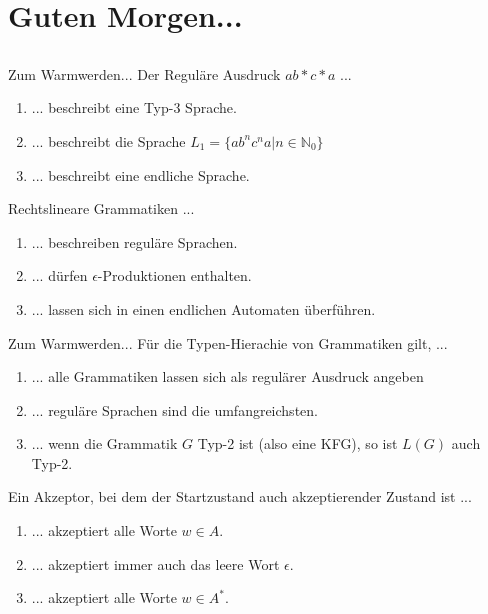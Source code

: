\section[Einstieg]{Guten Morgen...}
\subsection*{}
\begin{frame}{Zum Warmwerden...}
	 Der Reguläre Ausdruck $a{b*}{c*}a$ ...
	   \begin{enumerate}
	   \item { \only<2->{ \color{green!50!black} }
	   ... beschreibt eine Typ-3 Sprache.
	   }
	   \item { \only<2->{ \color{red} }
	   ... beschreibt die Sprache $L_1=\{ab^nc^na | n \in \mathbb{N}_0\}$
	   }
	   \item { \only<2->{ \color{red} }
	   ... beschreibt eine endliche Sprache.
	   }
	   \end{enumerate}

	 Rechtslineare Grammatiken ...
	   \begin{enumerate}
	   \item { \only<3->{ \color{green!50!black} }
	   ... beschreiben reguläre Sprachen.
	   }
	   \item { \only<3->{ \color{green!50!black} }
	   ... dürfen $\epsilon$-Produktionen enthalten.
	   }
	   \item { \only<3->{ \color{green!50!black} }
	   ... lassen sich in einen endlichen Automaten überführen.
	   }
	   \end{enumerate}
\end{frame}

\begin{frame}{Zum Warmwerden...}
	 Für die Typen-Hierachie von Grammatiken gilt, ...
	   \begin{enumerate}
	   \item { \only<2->{ \color{red} }
	   ... alle Grammatiken lassen sich als regulärer Ausdruck angeben
	   }
	   \item { \only<2->{ \color{red} }
	   ... reguläre Sprachen sind die umfangreichsten.
	   }
	   \item { \only<2->{ \color{red} }
	   ... wenn die Grammatik $G$ Typ-2 ist (also eine KFG), so ist $L(G)$ auch Typ-2.
	   }
	   \end{enumerate}
	   
	   
	 Ein Akzeptor, bei dem der Startzustand auch akzeptierender Zustand ist ...
	   \begin{enumerate}
	   \item { \only<3>{ \color{red} }
	   ... akzeptiert alle Worte $w \in A $.
	   }
	   \item { \only<3>{ \color{green!50!black} }
	   ... akzeptiert immer auch das leere Wort $ \epsilon $.
	   }
	   \item { \only<3>{ \color{red} }
	   ... akzeptiert alle Worte $w \in A^* $.
	   }
	   \end{enumerate}
\end{frame}
